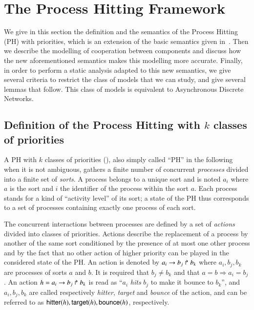 \section{The Process Hitting Framework}
\label{sec:ph}

We give in this section the definition and the semantics of the Process Hitting (PH) with priorities, which is an extension of the basic semantics given in~\cite{PMR10-TCSB}.
Then we describe the modelling of cooperation between components and discuss how the new aforementioned semantics makes this modelling more accurate.
Finally, in order to perform a static analysis adapted to this new semantics, we give several criteria to restrict the class of models that we can study,
and give several lemmas that follow.
This class of models is equivalent to Asynchronous Discrete Networks.

\subsection{Definition of the Process Hitting with $k$ classes of priorities}
\label{ssec:PH}
A PH with $k$ classes of priorities (), also simply called “PH” in the following when it is not ambiguous, gathers a finite number of concurrent \emph{processes} divided into a finite set of \emph{sorts}.
A process belongs to a unique sort and is noted $a_i$ where $a$ is the sort and $i$ the identifier of the process within the sort $a$.
Each process stands for a kind of “activity level” of its sort; a state of the PH thus corresponds to a set of processes containing exactly one process of each sort.

The concurrent interactions between processes are defined by a set of \emph{actions} divided into classes of priorities.
Actions describe the replacement of a process by another of the same sort conditioned by the presence of at most one other process and by the fact that no other action of higher priority can be played in the considered state of the PH.
An action is denoted by $a_i\rightarrow b_j\Rsh b_k$ where $a_i,b_j,b_k$ are processes of sorts $a$ and $b$.
It is required that $b_j \neq b_k$ and that $a=b\Rightarrow a_i=b_j$.
An action $h=a_i\rightarrow b_j\Rsh b_k$ is read as ``$a_i$ \emph{hits} $b_j$ to make it bounce to $b_k$'', and $a_i,b_j,b_k$ are called respectively \emph{hitter}, \emph{target} and \emph{bounce} of the action, and can be referred to as $\mathsf{hitter}(h), \mathsf{target}(h), \mathsf{bounce}(h)$, respectively.

